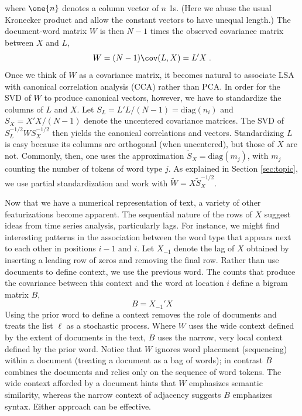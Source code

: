 \documentclass[12pt]{article}
\begin{document}
where $\one{n}$ denotes a column vector of $n$ 1s. (Here we abuse the usual Kronecker product and allow the constant vectors to have unequal length.)  The document-word matrix $W$ is then $N-1$ times the observed covariance matrix between $X$ and $L$,
\begin{equation*}
   W = (N-1) \cov(L,X) = L'X  \;.
\end{equation*}
Once we think of $W$ as a covariance matrix, it becomes natural to associate LSA with canonical correlation analysis (CCA) rather than PCA.  In order for the SVD of $W$ to produce canonical vectors, however, we have to standardize the columns of $L$ and $X$.  Let $S_L = L'L/(N-1) = \mbox{diag}(n_i)$ and $S_X = X'X/(N-1)$ denote the uncentered covariance matrices.    The SVD of $S_L^{-1/2} W S_X^{-1/2}$ then yields the canonical correlations and vectors.   Standardizing $L$ is easy because its columns are orthogonal (when uncentered), but those of $X$ are not.  Commonly, then, one uses the approximation $\widetilde{S}_X = \mbox{diag}(m_j)$, with $m_j$ counting the number of tokens of word type $j$.  As explained in Section \ref{sec:topic}, we use partial standardization and work with $\widetilde{W} =X \widetilde{S}_X^{-1/2}$.


 Now that we have a numerical representation of text, a variety of other featurizations become apparent.  The sequential nature of the rows of $X$ suggest ideas from time series analysis, particularly lags.  For instance, we might find interesting patterns in the association between the word type that appears next to each other in positions $i-1$ and $i$.  Let $X_{-1}$ denote the lag of $X$ obtained by inserting a leading row of zeros and removing the final row.  Rather than use documents to define context, we use the previous word.  The counts that produce the covariance between this context and the word at location $i$ define a bigram matrix $B$,
 \begin{equation}
   B = X_{-1}' X
\end{equation}
Using the prior word to define a context removes the role of documents and treats the list $\ell$ as a stochastic process.  Where $W$ uses the wide context defined by the extent of documents in the text, $B$ uses the narrow, very local context defined by the prior word. Notice that $W$ ignores word placement (sequencing) within a document (treating a document as a bag of words); in contrast $B$ combines the documents and relies only on the sequence of word tokens. The wide context afforded by a document hints that $W$ emphasizes semantic similarity, whereas the narrow context of adjacency suggests $B$ emphasizes syntax.  Either approach can be effective.
\end{document}
